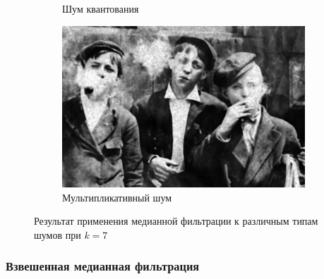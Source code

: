 \begin{figure}[ht!]
\begin{subfigure}[b]{0.5\linewidth}
      \caption{Шум квантования} 
      \label{median_7:e}
    \end{subfigure}%
    \begin{subfigure}[b]{0.5\linewidth}
        \centering
        \includegraphics[width=0.95\linewidth]{../Median_FIlter/Median_Speckle_noise_(k=7).jpg} 
        \caption{Мультипликативный шум} 
        \label{median_7:f} 
    \end{subfigure} 
    \caption{Результат применения медианной фильтрации к различным типам шумов при $k = 7$}
    \label{img:median_7} 
\end{figure}
\FloatBarrier

\subsubsection{Взвешенная медианная фильтрация}


